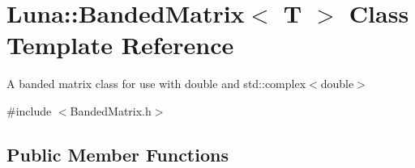 \hypertarget{classLuna_1_1BandedMatrix}{}\section{Luna\+:\+:Banded\+Matrix$<$ T $>$ Class Template Reference}
\label{classLuna_1_1BandedMatrix}


A banded matrix class for use with double and std\+::complex$<$double$>$  




{\ttfamily \#include $<$Banded\+Matrix.\+h$>$}

\subsection*{Public Member Functions}
